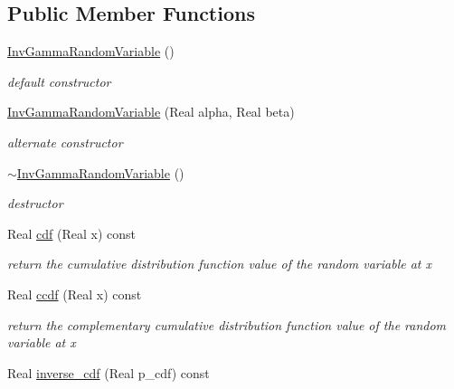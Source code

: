 \subsection*{Public Member Functions}
\begin{DoxyCompactItemize}
\item 
\hyperlink{classPecos_1_1InvGammaRandomVariable_a556029c5f42f838a84ed3a5c1371b2f0}{Inv\+Gamma\+Random\+Variable} ()\label{classPecos_1_1InvGammaRandomVariable_a556029c5f42f838a84ed3a5c1371b2f0}

\begin{DoxyCompactList}\small\item\em default constructor \end{DoxyCompactList}\item 
\hyperlink{classPecos_1_1InvGammaRandomVariable_a2d8ac3544ef1d95599584ad31201d514}{Inv\+Gamma\+Random\+Variable} (Real alpha, Real beta)\label{classPecos_1_1InvGammaRandomVariable_a2d8ac3544ef1d95599584ad31201d514}

\begin{DoxyCompactList}\small\item\em alternate constructor \end{DoxyCompactList}\item 
\hyperlink{classPecos_1_1InvGammaRandomVariable_ae4497f12cdcee76874463188097d526b}{$\sim$\+Inv\+Gamma\+Random\+Variable} ()\label{classPecos_1_1InvGammaRandomVariable_ae4497f12cdcee76874463188097d526b}

\begin{DoxyCompactList}\small\item\em destructor \end{DoxyCompactList}\item 
Real \hyperlink{classPecos_1_1InvGammaRandomVariable_addd564e7f4f314e12d38df74d845f0d8}{cdf} (Real x) const \label{classPecos_1_1InvGammaRandomVariable_addd564e7f4f314e12d38df74d845f0d8}

\begin{DoxyCompactList}\small\item\em return the cumulative distribution function value of the random variable at x \end{DoxyCompactList}\item 
Real \hyperlink{classPecos_1_1InvGammaRandomVariable_a23c3b599e7e4788a9a5e9e93c3dbaf4d}{ccdf} (Real x) const \label{classPecos_1_1InvGammaRandomVariable_a23c3b599e7e4788a9a5e9e93c3dbaf4d}

\begin{DoxyCompactList}\small\item\em return the complementary cumulative distribution function value of the random variable at x \end{DoxyCompactList}\item 
Real \hyperlink{classPecos_1_1InvGammaRandomVariable_a918a1aac05ca349ea5313eebcba46c3e}{inverse\+\_\+cdf} (Real p\+\_\+cdf) const \label{classPecos_1_1InvGammaRandomVariable_a918a1aac05ca349ea5313eebcba46c3e}


\end{DoxyCompactItemize}
